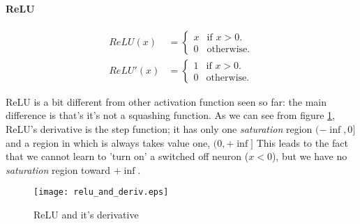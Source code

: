 \paragraph{ReLU}


\begin{align}
  ReLU(x)&=\begin{cases}
    x & \text{if $x>0$}.\\
    0 & \text{otherwise}.
  \end{cases} \\ 
   ReLU'(x)&=\begin{cases}
    1 & \text{if $x>0$}.\\
    0 & \text{otherwise}.
  \end{cases}
\end{align}


ReLU is a bit different from other activation function seen so far: the main difference is that's it's not a squashing function.
As we can see from figure \ref{relu_plot}, ReLU's derivative is the step function; it has only one \textit{saturation} region $(-\inf, 0]$ and a region in which is always takes value one, $(0,+\inf]$
This leads to the fact that we cannot learn to 'turn on' a switched off neuron ($x<0$), but we have no \textit{saturation} region toward $+\inf$.

\begin{figure}[h]
  \centering
    \texttt{[image: relu\_and\_deriv.eps]}
  \caption{ReLU and it's derivative}
\label{relu_plot}
\end{figure}
